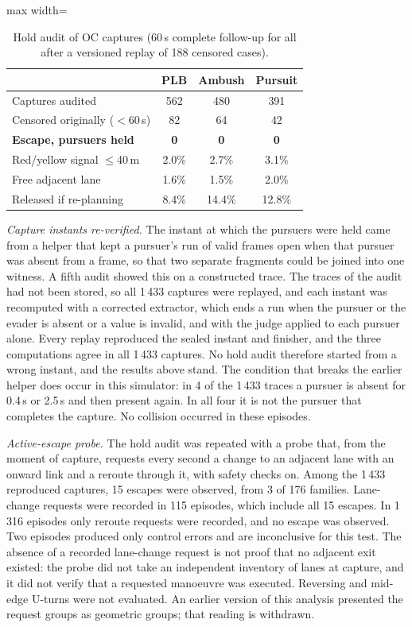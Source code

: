 \documentclass[preprint,12pt]{elsarticle}
\begin{document}
\begin{table}[!h]
\centering
\caption{Hold audit of OC captures (60\,s complete follow-up for all after a versioned replay of 188 censored cases).}
\label{tab:s-persistence}
\begin{adjustbox}{max width=\textwidth}
\begin{tabular}{@{}lccc@{}}
\toprule
& PLB & Ambush & Pursuit \\
\midrule
Captures audited & 562 & 480 & 391 \\
Censored originally ($<60$\,s) & 82 & 64 & 42 \\
\textbf{Escape, pursuers held} & \textbf{0} & \textbf{0} & \textbf{0} \\
Red/yellow signal $\le$40\,m & 2.0\% & 2.7\% & 3.1\% \\
Free adjacent lane & 1.6\% & 1.5\% & 2.0\% \\
Released if re-planning & 8.4\% & 14.4\% & 12.8\% \\
\bottomrule
\end{tabular}
\end{adjustbox}
\end{table}

\emph{Capture instants re-verified.} The instant at which the pursuers were held came from a helper that kept a
pursuer's run of valid frames open when that pursuer was absent from a frame, so that two separate fragments could be
joined into one witness. A fifth audit showed this on a constructed trace. The traces of the audit had not been
stored, so all 1\,433 captures were replayed, and each instant was recomputed with a corrected extractor, which ends
a run when the pursuer or the evader is absent or a value is invalid, and with the judge applied to each pursuer
alone. Every replay reproduced the sealed instant and finisher, and the three computations agree in all 1\,433
captures. No hold audit therefore started from a wrong instant, and the results above stand. The condition that
breaks the earlier helper does occur in this simulator: in 4 of the 1\,433 traces a pursuer is absent for 0.4\,s or
2.5\,s and then present again. In all four it is not the pursuer that completes the capture. No collision occurred
in these episodes.

\emph{Active-escape probe.} The hold audit was repeated with a probe that, from the moment of capture, requests every
second a change to an adjacent lane with an onward link and a reroute through it, with safety checks on. Among the
1\,433 reproduced captures, 15 escapes were observed, from 3 of 176 families. Lane-change requests were recorded in
115 episodes, which include all 15 escapes. In 1\,316 episodes only reroute requests were recorded, and no escape was
observed. Two episodes produced only control errors and are inconclusive for this test. The absence of a recorded
lane-change request is not proof that no adjacent exit existed: the probe did not take an independent inventory of
lanes at capture, and it did not verify that a requested manoeuvre was executed. Reversing and mid-edge U-turns were
not evaluated. An earlier version of this analysis presented the request groups as geometric groups; that reading is
withdrawn.
\end{document}
